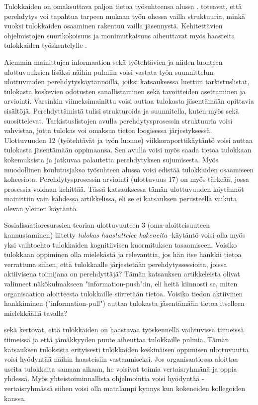 \documentclass[utf8]{gradu3}
\begin{document}
Tulokkaiden on omaksuttava paljon tietoa työsuhteensa alussa \parencite{dagenais-ym-2010}. \textcite{begel-simon-2008} toteavat, että perehdytys voi tapahtua tarpeen mukaan työn ohessa vailla struktuuria, minkä vuoksi tulokkaiden osaaminen rakentuu vailla jäsennystä. Kehitettävien ohjelmistojen suurikokoisuus ja monimutkaisuus aiheuttavat myös haasteita tulokkaiden työskentelylle %
\parencites%
    {craig-ym-2018}%
    {britto-ym-2019}%
\relax
% 
.

Aiemmin mainittujen informaation sekä työtehtävien ja niiden luonteen ulottuvuuksien lisäksi näihin pulmiin voisi vastata työn suunnittelun ulottuvuuden perehdytyskäytännöillä, joiksi katsauksessa luettiin tarkistuslistat, tulokasta koskevien odotusten sanallistaminen sekä tavoitteiden asettaminen ja arviointi. Varsinkin viimeksimainittu voisi auttaa tulokasta jäsentämään opittavia sisältöjä. Perehdyttämistä tulisi strukturoida ja suunnitella, kuten myös \textcite{britto-ym-2020} sekä \textcite{hemphill-begel-2011} suosittelevat. Tarkistuslistojen avulla perehdytysprosessin struktuuria voisi vahvistaa, jotta tulokas voi omaksua tietoa loogisessa järjestyksessä. Ulottuvuuden 12 (työtehtävät ja työn luonne) viikkoraporttikäytäntö voisi auttaa tulokasta jäsentämään oppimaansa. Sen avulla voisi myös saada tietoa tulokkaan kokemuksista ja jatkuvaa palautetta perehdytyksen sujumisesta. Myös muodollinen koulutusjakso työsuhteen alussa voisi edistää tulokkaiden osaamiseen koheesiota. Perehdytysprosessin arviointi (ulottuvuus 17) on myös tärkeää, jossa prosessia voidaan kehittää. Tässä katsauksessa tämän ulottuvuuden käytännöt mainittiin vain kahdessa artikkelissa, eli se ei katsauksen perusteella vaikuta olevan yleinen käytäntö.

Sosialisaatioresurssien teorian ulottuvuuteen 3 (oma-aloitteisuuteen kannustaminen) liitetty \textit{tulokas haastattelee kokeneita} -käytäntö voisi olla myös yksi vaihtoehto tulokkaiden kognitiivisen kuormituksen tasaamiseen. Voisiko tulokkaan oppiminen olla mielekästä ja relevanttia, jos hän itse hankkii tietoa verrattuna siihen, että tulokkaalle järjestetään perehdytyssessioita, joissa aktiivisena toimijana on perehdyttäjä? Tämän katsauksen artikkeleista \textcite{yates-ym-2020} olivat valinneet näkökulmakseen "information-push":in, eli heitä kiinnosti se, miten organisaation aloitteesta tulokkaille siirretään tietoa. Voisiko tiedon aktiivinen hankkiminen ("information-pull") auttaa tulokasta jäsentämään tietoa itselleen mielekkäällä tavalla?

\textcite{britto-ym-2019} sekä \textcite{begel-simon-2008} kertovat, että tulokkaiden on haastavaa työskennellä vaihtuvissa tiimeissä tiimeissä ja että jämäkkyyden puute aiheuttaa tulokkaille pulmia. Tämän katsauksen tuloksista erityisesti tulokkaiden keskinäisen oppimisen ulottuvuutta voisi hyödyntää näihin haasteisiin vastaamiseksi. Jos organisaatiossa aloittaa useita tulokkaita samaan aikaan, he voisivat toimia vertaisryhmänä ja oppia yhdessä. Myös yhteistoiminnallista ohjelmointia voisi hyödyntää - vertaisryhmässä siihen voisi olla matalampi kynnys kun kokeneiden kollegoiden kanssa. 
\end{document}
